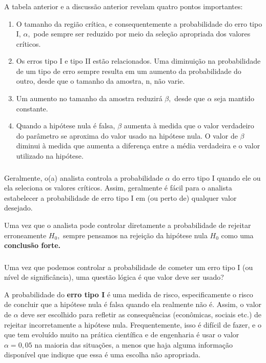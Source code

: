 \documentclass[14pt,aspectratio=1610]{beamer}
\newcommand{\Ho}{\ensuremath{H_{0}}}
\begin{document}
\begin{frame}{}
\frametitle{}
\begin{block}{}
\justifying
A tabela anterior e a discussão anterior revelam quatro pontos importantes:
\begin{enumerate}
\item O tamanho da região crítica, e consequentemente a probabilidade do erro tipo I, $\alpha,$ pode sempre ser reduzido por meio da seleção apropriada dos valores 
críticos. \pause
\item Os erros tipo I e tipo II estão relacionados. Uma diminuição na probabilidade de um tipo de erro sempre resulta em um aumento da probabilidade do outro, desde 
que o tamanho da amostra, n, não varie. \pause
\item Um aumento no tamanho da amostra reduzirá $\beta,$ desde que $\alpha$ seja mantido constante. \pause
\item Quando a hipótese nula é falsa, $\beta$ aumenta à medida que o valor verdadeiro do parâmetro se aproxima do valor usado na hipótese nula. O valor de $\beta$ 
diminui à medida que aumenta a diferença entre a média verdadeira e o valor utilizado na hipótese.
\end{enumerate}
\end{block}
\end{frame}

\begin{frame}{}
\frametitle{}
\begin{block}{}
\justifying
Geralmente, o(a) analista controla a probabilidade $\alpha$ do erro tipo I quando ele ou ela seleciona os valores críticos. Assim, geralmente é fácil para o analista 
estabelecer a probabilidade de erro tipo I em (ou perto de) qualquer valor desejado. 
\end{block}
\pause
\begin{block}{}
\justifying
Uma vez que o analista pode controlar diretamente a probabilidade de rejeitar erroneamente $\Ho,$ sempre pensamos na rejeição da hipótese nula $\Ho$ como uma 
\textbf{conclusão forte.}
\end{block}
\end{frame}

\begin{frame}{}
\frametitle{}
\begin{block}{}
\justifying
Uma vez que podemos controlar a probabilidade de cometer um erro tipo I (ou nível de significância), uma questão lógica é que valor deve ser usado?
\end{block}
\pause
\begin{block}{}
\justifying
A probabilidade do \textbf{erro tipo I} é uma medida de risco, especificamente o risco de concluir que a hipótese nula é falsa quando ela realmente não é. Assim, o valor 
de $\alpha$ deve ser escolhido para refletir as consequências (econômicas, sociais etc.) de rejeitar incorretamente a hipótese nula. Frequentemente, isso é difícil de fazer, 
e o que tem evoluído muito na prática científica e de engenharia é usar o valor $\alpha = 0,05$ na maioria das situações, a menos que haja alguma informação disponível 
que indique que essa é uma escolha não apropriada. 
\end{block}
\end{frame}
\end{document}
